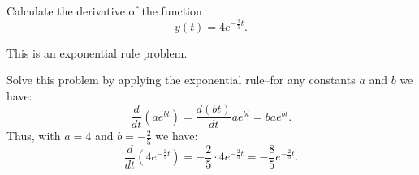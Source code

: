 \documentclass{ximera}
\author{Emma Smith Zbarsky}
\begin{document}
\begin{exercise}

Calculate the derivative of the function \[y(t) = 4e^{-\frac{2}{5}t}.\]


\begin{hint}
This is an exponential rule problem.
\end{hint}


\begin{hint}
Solve this problem by applying the exponential rule--for any constants
$a$ and $b$ we have:
\[\frac{d}{dt}\left(ae^{bt}\right) = \frac{d(bt)}{dt}ae^{bt} = bae^{bt}.\]
Thus, with $a=4$ and $b=-\frac{2}{5}$ we have:
\[\frac{d}{dt}\left(4e^{-\frac{2}{5}t}\right) = -\frac{2}{5}\cdot 4 e^{-\frac{2}{5}t} = \boxed{-\frac{8}{5}e^{-\frac{2}{5}t}}.\]
\end{hint}


\begin{multipleChoice}
\end{multipleChoice}

\end{exercise}
\end{document}
